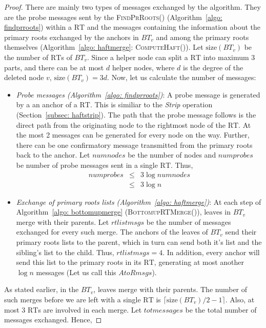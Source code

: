\documentclass[11pt, letter]{article}
\newcommand{\RT}{\mathrm{RT}}
\newcommand{\size}{\mathrm{size}}
\begin{document}
\begin{proof} There are mainly two types of messages exchanged by the algorithm. They are the probe messages sent by the
\textsc{FindPrRoots()} (Algorithm~\ref{algo: findprroots}) within a $\RT$ and the messages containing the information
about the primary roots exchanged by the anchors in $BT_{v}$ and among the primary roots themselves (Algorithm~\ref{algo:
haftmerge}: \textsc{ComputeHaft()}). Let $\size(BT_{v})$ be the number of $\RT$s of $BT_{v}$. Since a helper
node can split a $\RT$ into maximum 3 parts, and there can be at most $d$ helper nodes, where $d$ is the degree of the
deleted node $v$, $\size(BT_{v}) = 3d$.
Now, let us calculate the number of messages:
\begin{itemize}
\item \emph{Probe messages (Algorithm~\ref{algo: findprroots})}: A probe message is generated by a
 an anchor of a $\RT$. This is similiar to the \emph{Strip} operation
(Section~\ref{subsec: haftstrip}). The path that the probe message follows is the direct path from the originating
node to the rightmost node of the $\RT$. At the most 2 messages can be generated for every node on the way. Further,
there can be one confirmatory message transmitted from the primary roots back to the anchor. Let $numnodes$ be 
the number of nodes and $numprobes$ be number of probe messages sent in a single $\RT$.
Thus, 
\begin{eqnarray*}
 numprobes & \le & 3 \log numnodes  \\
   & \le & 3 \log n  
\end{eqnarray*}
\item \emph{Exchange of primary roots lists (Algorithm~\ref{algo: haftmerge})}:  At each step of Algorithm~\ref{algo:
bottomupmerge} (\textsc{BottomupRTMerge()}), leaves in $BT_{v}$ merge with their parents. Let $rtlistmsgs$
be the number of messages exchanged for every such merge.  The anchors of the leaves of $BT_{v}$ send their primary
roots lists to the parent, which in turn can send both it's list and the sibling's list to the child.  Thus,
$rtlistmsgs = 4$. In addition, every anchor will send this list to the primary roots in its $\RT$, generating at most
another $\log n$ messages (Let us call this $AtoRmsgs$).
\end{itemize}
As stated earlier, in the $BT_{v}$, leaves merge with their parents. The number of such merges
before we are left with a single $\RT$ is $\lceil \size(BT_{v})/2 - 1 \rceil$. Also, at most 3 $\RT$s are involved in
each merge. Let $totmessages$ be the total number of messages exchanged. Hence,


\end{proof}
\end{document}
